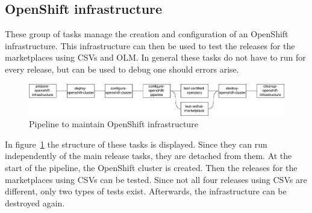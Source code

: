 \subsection{OpenShift infrastructure}\label{subsec:openshift-infrastructure}

These group of tasks manage the creation and configuration of an OpenShift infrastructure.
This infrastructure can then be used to test the releases for the marketplaces using CSVs and OLM.
In general these tasks do not have to run for every release, but can be used to debug one should errors arise.

\begin{figure}[H]
    \centering
    \includegraphics[width=\textwidth]{img/implementation/openshift}
    \caption{Pipeline to maintain OpenShift infrastructure}
    \label{fig:pipeline-to-maintain-openshift-infrastructure}
\end{figure}

In figure~\ref{fig:pipeline-to-maintain-openshift-infrastructure} the structure of these tasks is displayed.
Since they can run independently of the main release tasks, they are detached from them.
At the start of the pipeline, the OpenShift cluster is created.
Then the releases for the marketplaces using CSVs can be tested.
Since not all four releases using CSVs are different, only two types of tests exist.
Afterwards, the infrastructure can be destroyed again.















